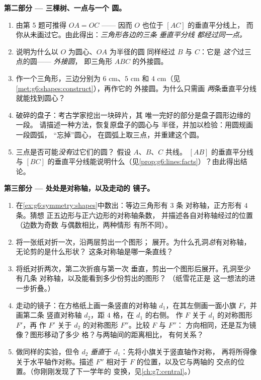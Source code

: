 \begin{problem}
\medskip
\noindent\textbf{第二部分 --- 三棵树、一点与一个
圆。}
\begin{enumerate}[resume]
  \item 由第 5 题可推得 $OA = OC$ —— 因而
        $O$ 也位于 $[AC]$ 的垂直平分线上，
        而你从未画过它。由此得出：\emph{三角形各边的三条
        垂直平分线
        都经过同一点。}
  \item 说明为什么以 $O$ 为圆心、$OA$ 为半径的圆
        同样经过 $B$ 与 $C$：它是
        \emph{这个}过三点的圆——
        \emph{外接圆}，
        即三角形 $ABC$ 的外接圆。
  \item 作一个三角形，三边分别为 $6$ cm、$5$ cm 和
        $4$ cm（见\cref{met:g6:shapes:construct}），再作它的
        外接圆。为什么只需画
        \emph{两}条垂直平分线就能找到圆心？
  \item 破碎的盘子：考古学家挖出一块碎片，其
        唯一完好的部分是盘子圆形边缘的一段。
        请描述一种方法，恢复原盘子的圆心与
        半径，并加以检验：用圆规画一段圆弧，
        “忘掉”圆心，
        在圆弧上取三点，并重建这个圆。
  \item 三点是否可能\emph{没有}过它们的圆？
        假设 $A$、$B$、$C$ 共线。
        $[AB]$ 的垂直平分线与
        $[BC]$ 的垂直平分线能说明什么（见\cref{prop:g6:lines:facts}）？由此得出结论。
\end{enumerate}

\medskip
\noindent\textbf{第三部分 --- 处处是对称轴，以及走动的
镜子。}
\begin{enumerate}[resume]
  \item 在\cref{ex:g6:symmetry:shapes}中数出：等边三角形有 $3$ 条
        对称轴，正方形有 $4$ 条。猜想
        正五边形与正六边形的对称轴条数，
        并描述各自对称轴经过的位置（边数为奇数
        与偶数相比，两种情形
        有所不同）。
  \item 将一张纸对折一次，沿两层剪出一个图形；
        展开。为什么孔洞\emph{总}有对称轴，
        无论剪的是什么形状？
        这条对称轴是哪一条直线？
  \item 将纸对折两次，第二次折痕与第一次
        垂直，剪出一个图形后展开。孔洞至少有几条
        对称轴，以及能看到多少份剪出的图形？
        （纸雪花正是
        这一想法的进一步折叠。）
  \item 走动的镜子：在方格纸上画一条竖直的对称轴
        $d_1$，在其左侧画一面小旗 $F$，并画第二条
        竖直对称轴 $d_2$，距 $4$ 格，在 $d_1$ 的右侧。
        作 $F$ 关于 $d_1$ 的对称图形 $F'$，再
        作 $F'$ 关于 $d_2$ 的对称图形 $F''$。比较 $F$ 与 $F''$：
        方向相同，还是互为镜像？图形移动了多少
        格？与两轴间的距离相比，
        有何关系？
  \item 做同样的实验，但令 $d_2$ \emph{垂直}于
        $d_1$：先将小旗关于竖直轴作对称，
        再将所得像关于水平轴作对称。描述 $F''$
        相对于 $F$ 的位置，以及它与两轴的
        交点的位置。（你刚刚发现了下一学年的
        变换，见\cref{ch:g7:central}。）
\end{enumerate}
\end{problem}
